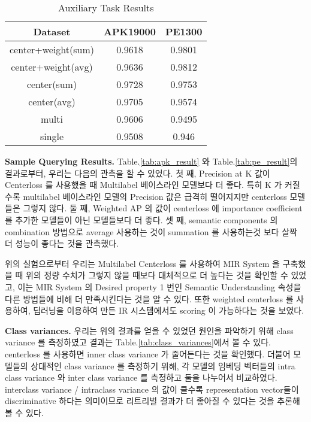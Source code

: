 \begin{table}[!htb]%
\caption{Auxiliary Task Results}
\label{tab:auxiliary_result}
\begin{minipage}{\columnwidth}
\begin{center}
\begin{tabular}{|c|c|c|}
\hline
Dataset             & APK19000 & PE1300 \\ \hline
center+weight(sum)  & 0.9618   & 0.9801 \\ \hline
center+weight(avg) & 0.9636   & 0.9812 \\ \hline
center(sum)         & 0.9728   & 0.9753 \\ \hline
center(avg)        & 0.9705   & 0.9574 \\ \hline
multi               & 0.9606   & 0.9495 \\ \hline
single              & 0.9508   & 0.946  \\ \hline
\end{tabular}
\end{center}
\bigskip\centering
\end{minipage}
\end{table}%


\textbf{Sample Querying Results. }
Table.\ref{tab:apk_result} 와 Table.\ref{tab:pe_result}의 결과로부터, 우리는 다음의 관측을 할 수 있었다. 
첫 째, Precision at K 값이 Centerloss 를 사용했을 때 Multilabel 베이스라인 모델보다 더 좋다. 특히 K 가 커질수록 multilabel 베이스라인 모델의 Precision 값은 급격히 떨어지지만 centerloss 모델들은 그렇지 않다. 
둘 째, Weighted AP 의 값이 centerloss 에 importance coefficient 를 추가한 모델들이 아닌 모델들보다 더 좋다. 
셋 째, semantic components 의 combination 방법으로 average 사용하는 것이 summation 를 사용하는것 보다 살짝 더 성능이 좋다는 것을 관측했다.

위의 실험으로부터 우리는 Multilabel Centerloss 를 사용하여 MIR System 을 구축했을 때 위의 정량 수치가 그렇지 않을 때보다 대체적으로 더 높다는 것을 확인할 수 있었고, 이는 MIR System 의 Desired property 1 번인 Semantic Understanding 속성을 다른 방법들에 비해 더 만족시킨다는 것을 알 수 있다. 또한 weighted centerloss 를 사용하여, 딥러닝을 이용하여 만든 IR 시스템에서도 scoring 이 가능하다는 것을 보였다. 


\textbf{Class variances. }
우리는 위의 결과를 얻을 수 있었던 원인을 파악하기 위해 class variance 를 측정하였고 결과는 Table.\ref{tab:class_variances}에서 볼 수 있다. centerloss 를 사용하면 inner class variance 가 줄어든다는 것을 확인했다. 더불어 모델들의 상대적인 class variance 를 측정하기 위해, 각 모델의 임베딩 벡터들의 intra class variance 와 inter class variance 를 측정하고 둘을 나누어서 비교하였다. interclass variance / intraclass variance 의 값이 클수록 representation vector들이 discriminative 하다는 의미이므로 리트리벌 결과가 더 좋아질 수 있다는 것을 추론해볼 수 있다. 


